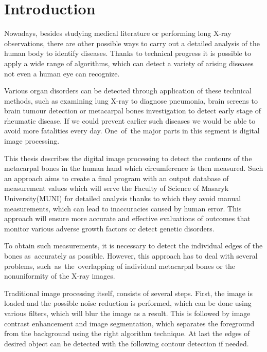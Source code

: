 \chapter{Introduction}
Nowadays, besides studying medical literature or performing long X-ray observations, there are other possible ways to carry out a detailed analysis of the human body to identify diseases. Thanks to technical progress it is possible to apply a wide range of algorithms, which can detect a variety of arising diseases not even a human eye can recognize.

Various organ disorders can be detected through application of these technical methods, such as examining lung X-ray to diagnose pneumonia, brain screens to brain tumour detection or metacarpal bones investigation to detect early stage of rheumatic disease. If we could prevent earlier such diseases we would be able to avoid more fatalities every day. One~of~the major parts in this segment is digital image processing.

This thesis describes the digital image processing to detect the contours of the metacarpal bones in the human hand which circumference is then measured. Such an approach aims to create a final program with an output database of measurement values which will serve the Faculty of Science of Masaryk University(MUNI) for detailed analysis thanks to which they avoid manual measurements, which can lead to inaccuracies caused by human error. This approach will ensure more accurate and effective evaluations of outcomes that monitor various adverse growth factors or detect genetic disorders.

To obtain such measurements, it is necessary to detect the individual edges of the bones as~accurately as possible. However, this approach has to deal with several problems, such~as~the~overlapping of individual metacarpal bones or the nonuniformity of the X-ray images.

Traditional image processing itself, consists of several steps. First, the image is loaded and the possible noise reduction is performed, which can be done using various filters, which will blur the image as a result. This is followed by image contrast enhancement and image segmentation, which separates the foreground from the background using the right algorithm technique. At last the edges of desired object can be detected with the following contour detection if needed.

